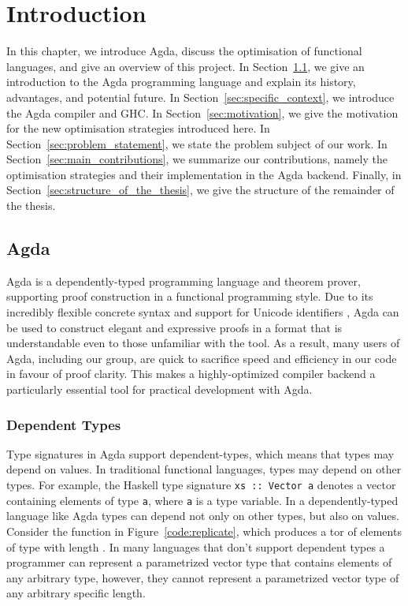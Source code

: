 \chapter{Introduction}
\label{cha:introduction}

In this chapter, we introduce Agda, discuss the optimisation of functional languages, and give an overview of this project. In Section~\ref{sec:general_context}, we give an introduction to the Agda programming language and explain its history, advantages, and potential future. In Section~\ref{sec:specific_context}, we introduce the Agda compiler and GHC. In Section~\ref{sec:motivation}, we give the motivation for the new optimisation strategies introduced here. In Section~\ref{sec:problem_statement}, we state the problem subject of our work. In Section~\ref{sec:main_contributions}, we summarize our contributions, namely the optimisation strategies and their implementation in the Agda backend. Finally, in Section~\ref{sec:structure_of_the_thesis}, we give the structure of the remainder of the thesis.

\section{Agda}
\label{sec:general_context}

Agda \cite{norell2007} is a dependently-typed programming language and theorem prover, supporting proof construction in a functional programming style. Due to its incredibly flexible concrete syntax and support for Unicode identifiers \cite{bove2009}, Agda can be used to construct elegant and expressive proofs in a format that is understandable even to those unfamiliar with the tool. As a result, many users of Agda, including our group, are quick to sacrifice speed and efficiency in our code in favour of proof clarity. This makes a highly-optimized compiler backend a particularly essential tool for practical development with Agda.

\subsection{Dependent Types}

Type signatures in Agda support dependent-types, which means that types may depend on values. In traditional functional languages, types may depend on other types. For example, the Haskell type signature \lstinline{xs :: Vector a} denotes a vector containing elements of type \lstinline{a}, where \lstinline{a} is a type variable. In a dependently-typed language like Agda types can depend not only on other types, but also on values. Consider the  function in Figure~\ref{code:replicate}, which produces a tor of elements of type  with length .\cite{norell2009} In many languages that don't support dependent types a programmer can represent a parametrized vector type that contains elements of any arbitrary type, however, they cannot represent a parametrized vector type of any arbitrary specific length.

